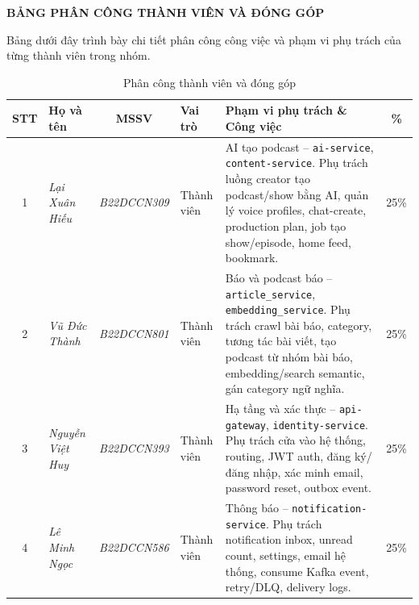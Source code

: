\documentclass[14pt,a4paper,oneside]{extreport}
\begin{document}
\newpage
\thispagestyle{fancy}
\begin{center}
  {\Large\textbf{BẢNG PHÂN CÔNG THÀNH VIÊN VÀ ĐÓNG GÓP}}
\end{center}

\vspace{0.5cm}

\noindent
Bảng dưới đây trình bày chi tiết phân công công việc và phạm vi phụ trách của từng thành viên trong nhóm.

\vspace{0.5cm}

\begin{table}[H]
\centering
\caption{Phân công thành viên và đóng góp}
\label{tab:phan-cong}
\renewcommand{\arraystretch}{1.4}
\small
\begin{tabularx}{\textwidth}{|c|l|c|l|X|c|}
\hline
\textbf{STT} & \textbf{Họ và tên} & \textbf{MSSV} & \textbf{Vai trò} & \textbf{Phạm vi phụ trách \& Công việc} & \textbf{\%} \\
\hline
1 &
  \textit{Lại Xuân Hiếu} &
  \textit{B22DCCN309} &
  Thành viên &
  AI tạo podcast -- \texttt{ai-service}, \texttt{content-service}. Phụ trách luồng creator tạo podcast/show bằng AI, quản lý voice profiles, chat-create, production plan, job tạo show/episode, home feed, bookmark. &
  25\% \\
\hline
2 &
  \textit{Vũ Đức Thành} &
  \textit{B22DCCN801} &
  Thành viên &
  Báo và podcast báo -- \texttt{article\_service}, \texttt{embedding\_service}. Phụ trách crawl bài báo, category, tương tác bài viết, tạo podcast từ nhóm bài báo, embedding/search semantic, gán category ngữ nghĩa. &
  25\% \\
\hline
3 &
  \textit{Nguyễn Việt Huy} &
  \textit{B22DCCN393} &
  Thành viên &
  Hạ tầng và xác thực -- \texttt{api-gateway}, \texttt{identity-service}. Phụ trách cửa vào hệ thống, routing, JWT auth, đăng ký/đăng nhập, xác minh email, password reset, outbox event. &
  25\% \\
\hline
4 &
  \textit{Lê Minh Ngọc} &
  \textit{B22DCCN586} &
  Thành viên &
  Thông báo -- \texttt{notification-service}. Phụ trách notification inbox, unread count, settings, email hệ thống, consume Kafka event, retry/DLQ, delivery logs. &
  25\% \\
\hline
\end{tabularx}
\end{table}
\end{document}
